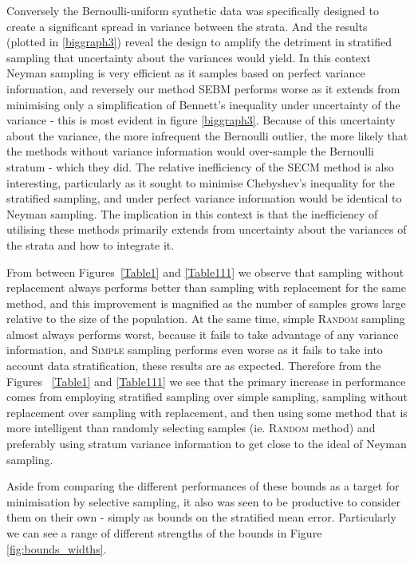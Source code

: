 Conversely the Bernoulli-uniform synthetic data was specifically designed to create a significant spread in variance between the strata.
And the results (plotted in \ref{biggraph3}) reveal the design to amplify the detriment in stratified sampling that uncertainty about the variances would yield.
In this context Neyman sampling is very efficient as it samples based on perfect variance information, and reversely our method SEBM performs worse as it extends from minimising only a simplification of Bennett's inequality under uncertainty of the variance - this is most evident in figure \ref{biggraph3}.
Because of this uncertainty about the variance, the more infrequent the Bernoulli outlier, the more likely that the methods without variance information would over-sample the Bernoulli stratum - which they did.
The relative inefficiency of the SECM method is also interesting, particularly as it sought to minimise Chebyshev's inequality for the stratified sampling, and under perfect variance information would be identical to Neyman sampling.
The implication in this context is that the inefficiency of utilising these methods primarily extends from uncertainty about the variances of the strata and how to integrate it.

From between Figures~\ref{Table1} and \ref{Table111} we observe that sampling without replacement always performs better than sampling with replacement for the same method, and this improvement is magnified as the number of samples grows large relative to the size of the population. 
At the same time, simple \textsc{Random} sampling almost always performs worst, because it fails to take advantage of any variance information, and \textsc{Simple} sampling performs even worse as it fails to take into account data stratification, these results are as expected.
Therefore from the Figures ~\ref{Table1} and \ref{Table111} we see that the primary increase in performance comes from employing stratified sampling over simple sampling, sampling without replacement over sampling with replacement, and then using some method that is more intelligent than randomly selecting samples (ie. \textsc{Random} method) and preferably using stratum variance information to get close to the ideal of Neyman sampling.

Aside from comparing the different performances of these bounds as a target for minimisation by selective sampling, it also was seen to be productive to consider them on their own - simply as bounds on the stratified mean error.
Particularly we can see a range of different strengths of the bounds in Figure \ref{fig:bounds_widths}.

